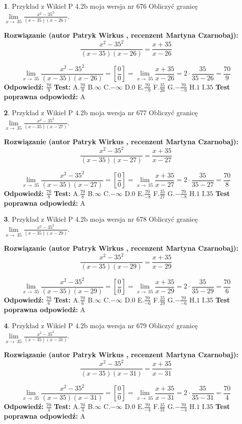 \documentclass[12pt, a4paper]{article}
\theoremstyle{definition} %
\newtheorem{zad}{}
\newcommand{\zadStart}[1]{\begin{zad}#1\newline}
\newcommand{\zadStop}{\end{zad}}
\newcommand{\rozwStart}[2]{\noindent \textbf{Rozwiązanie (autor #1 , recenzent #2): }\newline}
\newcommand{\rozwStop}{\newline}
\newcommand{\odpStart}{\noindent \textbf{Odpowiedź:}\newline}
\newcommand{\odpStop}{\newline}
\newcommand{\testStart}{\noindent \textbf{Test:}\newline}
\newcommand{\testStop}{\newline}
\newcommand{\kluczStart}{\noindent \textbf{Test poprawna odpowiedź:}\newline}
\newcommand{\kluczStop}{\newline}
\begin{document}
\zadStart{Przykład z Wikieł P 4.2b moja wersja nr 676}
Obliczyć granicę $\lim\limits_{x\to\ 35}\frac{x^{2}-35^{2}}{(x-35)(x-26)}$.
\zadStop
\rozwStart{Patryk Wirkus}{Martyna Czarnobaj}
$$\frac{x^{2}-35^{2}}{(x-35)(x-26)}=\frac{x+35}{x-26}$$

$$\lim\limits_{x\to\ 35}\frac{x^{2}-35^{2}}{(x-35)(x-26)}=[\frac{0}{0}]=\lim\limits_{x\to\ 35}\frac{x+35}{x-26}=2 \cdot \frac{35}{35-26} = \frac{70}{9}$$
\rozwStop
\odpStart
$\frac{70}{9}$
\odpStop
\testStart
A.$\frac{70}{9}$
B.$\infty$
C.$-\infty$
D.$0$
E.$\frac{70}{-9}$
F.$\frac{35}{26}$
G.$-\frac{70}{-9}$
H.$1$
I.$35$
\testStop
\kluczStart
A
\kluczStop



\zadStart{Przykład z Wikieł P 4.2b moja wersja nr 677}
Obliczyć granicę $\lim\limits_{x\to\ 35}\frac{x^{2}-35^{2}}{(x-35)(x-27)}$.
\zadStop
\rozwStart{Patryk Wirkus}{Martyna Czarnobaj}
$$\frac{x^{2}-35^{2}}{(x-35)(x-27)}=\frac{x+35}{x-27}$$

$$\lim\limits_{x\to\ 35}\frac{x^{2}-35^{2}}{(x-35)(x-27)}=[\frac{0}{0}]=\lim\limits_{x\to\ 35}\frac{x+35}{x-27}=2 \cdot \frac{35}{35-27} = \frac{70}{8}$$
\rozwStop
\odpStart
$\frac{70}{8}$
\odpStop
\testStart
A.$\frac{70}{8}$
B.$\infty$
C.$-\infty$
D.$0$
E.$\frac{70}{-8}$
F.$\frac{35}{27}$
G.$-\frac{70}{-8}$
H.$1$
I.$35$
\testStop
\kluczStart
A
\kluczStop



\zadStart{Przykład z Wikieł P 4.2b moja wersja nr 678}
Obliczyć granicę $\lim\limits_{x\to\ 35}\frac{x^{2}-35^{2}}{(x-35)(x-29)}$.
\zadStop
\rozwStart{Patryk Wirkus}{Martyna Czarnobaj}
$$\frac{x^{2}-35^{2}}{(x-35)(x-29)}=\frac{x+35}{x-29}$$

$$\lim\limits_{x\to\ 35}\frac{x^{2}-35^{2}}{(x-35)(x-29)}=[\frac{0}{0}]=\lim\limits_{x\to\ 35}\frac{x+35}{x-29}=2 \cdot \frac{35}{35-29} = \frac{70}{6}$$
\rozwStop
\odpStart
$\frac{70}{6}$
\odpStop
\testStart
A.$\frac{70}{6}$
B.$\infty$
C.$-\infty$
D.$0$
E.$\frac{70}{-6}$
F.$\frac{35}{29}$
G.$-\frac{70}{-6}$
H.$1$
I.$35$
\testStop
\kluczStart
A
\kluczStop



\zadStart{Przykład z Wikieł P 4.2b moja wersja nr 679}
Obliczyć granicę $\lim\limits_{x\to\ 35}\frac{x^{2}-35^{2}}{(x-35)(x-31)}$.
\zadStop
\rozwStart{Patryk Wirkus}{Martyna Czarnobaj}
$$\frac{x^{2}-35^{2}}{(x-35)(x-31)}=\frac{x+35}{x-31}$$

$$\lim\limits_{x\to\ 35}\frac{x^{2}-35^{2}}{(x-35)(x-31)}=[\frac{0}{0}]=\lim\limits_{x\to\ 35}\frac{x+35}{x-31}=2 \cdot \frac{35}{35-31} = \frac{70}{4}$$
\rozwStop
\odpStart
$\frac{70}{4}$
\odpStop
\testStart
A.$\frac{70}{4}$
B.$\infty$
C.$-\infty$
D.$0$
E.$\frac{70}{-4}$
F.$\frac{35}{31}$
G.$-\frac{70}{-4}$
H.$1$
I.$35$
\testStop
\kluczStart
A
\kluczStop
\end{document}
